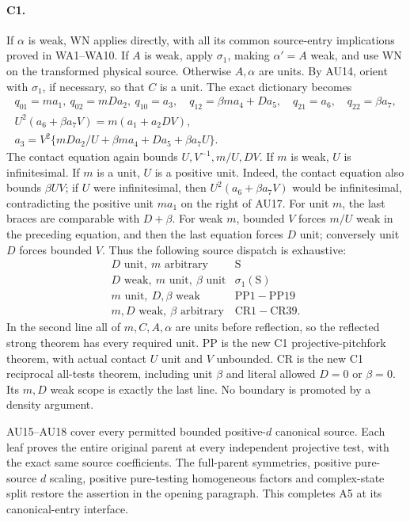 \paragraph{C1.}
If \(\alpha\) is weak, WN applies directly, with all its common
source-entry implications proved in WA1--WA10.
If \(A\) is weak, apply \(\sigma_1\), making \(\alpha'=A\) weak,
and use WN on the transformed physical source.
Otherwise \(A,\alpha\) are units.
By AU14, orient with \(\sigma_1\), if necessary, so that \(C\)
is a unit. The exact dictionary becomes
\[
\begin{gathered}
 q_{01}=ma_1,\ q_{02}=mDa_2,\ q_{10}=a_3,\quad
 q_{12}=\beta ma_4+Da_5,\quad q_{21}=a_6,\quad q_{22}=\beta a_7,\\
 U^2(a_6+\beta a_7V)=m(a_1+a_2DV),\\
 a_3=V^2\{mDa_2/U+\beta ma_4+Da_5+\beta a_7U\}.
\end{gathered}\tag{AU17}
\]
The contact equation again bounds \(U,V^{-1},m/U,DV\).
If \(m\) is weak, \(U\) is infinitesimal.
If \(m\) is a unit, \(U\) is a positive unit.
Indeed, the contact equation also bounds \(\beta UV\); if
\(U\) were infinitesimal, then
\(U^2(a_6+\beta a_7V)\) would be infinitesimal, contradicting
the positive unit \(ma_1\) on the right of AU17.
For unit \(m\), the last braces are comparable with \(D+\beta\).
For weak \(m\), bounded \(V\) forces \(m/U\) weak in the
preceding equation, and then the last equation forces \(D\)
unit; conversely unit \(D\) forces bounded \(V\).
Thus the following source dispatch is exhaustive:
\[
\begin{array}{c|c}
 D\text{ unit},\ m\text{ arbitrary}&\mathrm S\\
 D\text{ weak},\ m\text{ unit},\ \beta\text{ unit}
       &\sigma_1(\mathrm S)\\
 m\text{ unit},\ D,\beta\text{ weak}
       &\mathrm{PP1\!-\!PP19}\\
 m,D\text{ weak},\ \beta\text{ arbitrary}
       &\mathrm{CR1\!-\!CR39}.
\end{array}\tag{AU18}
\]
In the second line all of \(m,C,A,\alpha\) are units before
reflection, so the reflected strong theorem has every required
unit. PP is the new C1 projective-pitchfork theorem, with actual
contact \(U\) unit and \(V\) unbounded.
CR is the new C1 reciprocal all-tests theorem, including unit
\(\beta\) and literal allowed \(D=0\) or \(\beta=0\).
Its \(m,D\) weak scope is exactly the last line.
No boundary is promoted by a density argument.

AU15--AU18 cover every permitted bounded positive-\(d\) canonical
source. Each leaf proves the entire original parent at every
independent projective test, with the exact same source coefficients.
The full-parent symmetries, positive pure-source \(d\) scaling,
positive pure-testing homogeneous factors and complex-state split
restore the assertion in the opening paragraph. This completes
A5 at its canonical-entry interface.

